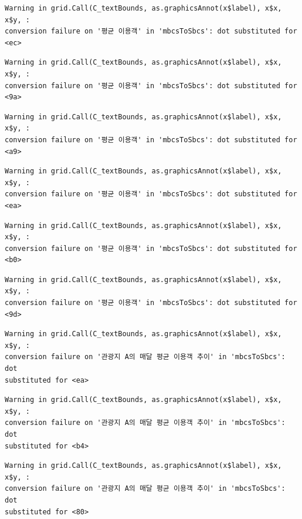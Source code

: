 \documentclass[
  letterpaper,
  DIV=11,
  numbers=noendperiod]{scrreprt}
\begin{document}
\begin{verbatim}
Warning in grid.Call(C_textBounds, as.graphicsAnnot(x$label), x$x, x$y, :
conversion failure on '평균 이용객' in 'mbcsToSbcs': dot substituted for <ec>
\end{verbatim}

\begin{verbatim}
Warning in grid.Call(C_textBounds, as.graphicsAnnot(x$label), x$x, x$y, :
conversion failure on '평균 이용객' in 'mbcsToSbcs': dot substituted for <9a>
\end{verbatim}

\begin{verbatim}
Warning in grid.Call(C_textBounds, as.graphicsAnnot(x$label), x$x, x$y, :
conversion failure on '평균 이용객' in 'mbcsToSbcs': dot substituted for <a9>
\end{verbatim}

\begin{verbatim}
Warning in grid.Call(C_textBounds, as.graphicsAnnot(x$label), x$x, x$y, :
conversion failure on '평균 이용객' in 'mbcsToSbcs': dot substituted for <ea>
\end{verbatim}

\begin{verbatim}
Warning in grid.Call(C_textBounds, as.graphicsAnnot(x$label), x$x, x$y, :
conversion failure on '평균 이용객' in 'mbcsToSbcs': dot substituted for <b0>
\end{verbatim}

\begin{verbatim}
Warning in grid.Call(C_textBounds, as.graphicsAnnot(x$label), x$x, x$y, :
conversion failure on '평균 이용객' in 'mbcsToSbcs': dot substituted for <9d>
\end{verbatim}

\begin{verbatim}
Warning in grid.Call(C_textBounds, as.graphicsAnnot(x$label), x$x, x$y, :
conversion failure on '관광지 A의 매달 평균 이용객 추이' in 'mbcsToSbcs': dot
substituted for <ea>
\end{verbatim}

\begin{verbatim}
Warning in grid.Call(C_textBounds, as.graphicsAnnot(x$label), x$x, x$y, :
conversion failure on '관광지 A의 매달 평균 이용객 추이' in 'mbcsToSbcs': dot
substituted for <b4>
\end{verbatim}

\begin{verbatim}
Warning in grid.Call(C_textBounds, as.graphicsAnnot(x$label), x$x, x$y, :
conversion failure on '관광지 A의 매달 평균 이용객 추이' in 'mbcsToSbcs': dot
substituted for <80>
\end{verbatim}
\end{document}
